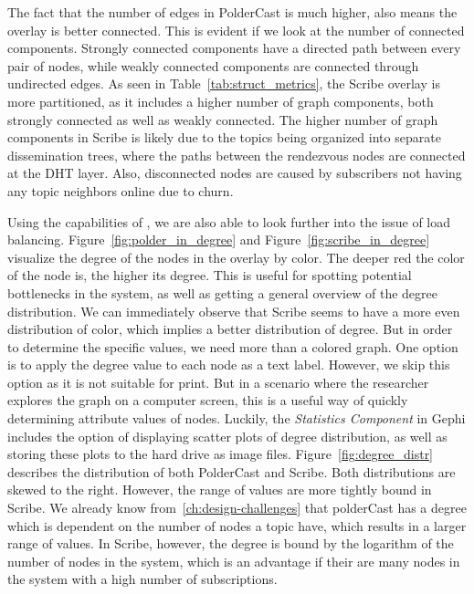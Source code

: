 The fact that the number of edges in PolderCast is much higher, also
means the overlay is better connected. This is evident if we look at the
number of connected components. Strongly connected components have a
directed path between every pair of nodes, while weakly connected
components are connected through undirected edges. As seen in
Table~\ref{tab:struct_metrics}, the Scribe overlay is more partitioned,
as it includes a higher number of graph components, both strongly
connected as well as weakly connected. The higher number of graph
components in Scribe is likely due to the topics being organized into
separate dissemination trees, where the paths between the rendezvous
nodes are connected at the DHT layer. Also, disconnected nodes are
caused by subscribers not having any topic neighbors online due to
churn.

Using the capabilities of \demo{}, we are also able to look further into
the issue of load balancing. Figure~\ref{fig:polder_in_degree} and
Figure~\ref{fig:scribe_in_degree} visualize the degree of the nodes in
the overlay by color. The deeper red the color of the node is, the
higher its degree. This is useful for spotting potential bottlenecks in
the system, as well as getting a general overview of the degree
distribution. We can immediately observe that Scribe seems to have a
more even distribution of color, which implies a better distribution of
degree. But in order to determine the specific values, we need more than
a colored graph. One option is to apply the degree value to each node as
a text label. However, we skip this option as it is not suitable for
print. But in a scenario where the researcher explores the graph on a
computer screen, this is a useful way of quickly determining attribute
values of nodes. Luckily, the \emph{Statistics Component} in Gephi
includes the option of displaying scatter plots of degree distribution,
as well as storing these plots to the hard drive as image files.
Figure~\ref{fig:degree_distr} describes the distribution of both
PolderCast and Scribe. Both distributions are skewed to the right.
However, the range of values are more tightly bound in Scribe. We
already know from~\ref{ch:design-challenges} that polderCast has a
degree which is dependent on the number of nodes a topic have, which
results in a larger range of values. In Scribe, however, the degree is
bound by the logarithm of the number of nodes in the system, which is an
advantage if their are many nodes in the system with a high number of
subscriptions.


